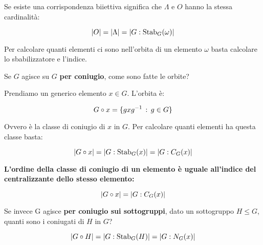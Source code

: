 Se esiste una corrispondenza biiettiva significa che $\Lambda$ e $O$ hanno la stessa cardinalità:

\begin{equation}
	\lvert O \rvert = \lvert \Lambda \rvert = \lvert G:\operatorname{Stab}_G(\omega) \rvert
\end{equation}

Per calcolare quanti elementi ci sono nell'orbita di un elemento $\omega$ basta calcolare lo sbabilizzatore e l'indice.

Se $G$ agisce su $G$ \textbf{per coniugio}, come sono fatte le orbite?

Prendiamo un generico elemento $x \in G$. L'orbita è:

\begin{equation}
	G \circ x = \{gxg^{-1} \,:\, g \in G\}
\end{equation}

Ovvero è la classe di coniugio di $x$ in $G$. Per calcolare quanti elementi ha questa classe basta:

\begin{equation}
	\lvert G \circ x \rvert = \lvert G:\operatorname{Stab}_G(x) \rvert = \lvert G:C_G(x) \rvert
\end{equation}

\textbf{L'ordine della classe di coniugio di un elemento è uguale all'indice del centralizzante dello stesso elemento:}

\begin{equation}
	\label{eq:ordine_classe_coniugio}
	\lvert G \circ x \rvert = \lvert G:C_G(x) \rvert
\end{equation}

Se invece G agisce \textbf{per coniugio sui sottogruppi}, dato un sottogruppo $H \le G$, quanti sono i coniugati di $H$ in $G$?

\begin{equation}
	\lvert G \circ H \rvert = \lvert G:\operatorname{Stab}_G(H) \rvert = \lvert G:N_G(x) \rvert
\end{equation}

